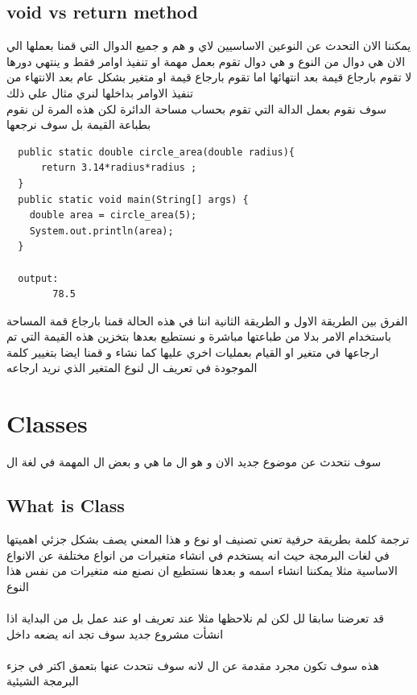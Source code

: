 \subsection{void vs return method}
\begin{AR}
  يمكننا الان التحدث عن 
  النوعين الاساسيين لاي  و هم  و 
  جميع الدوال التي قمنا بعملها الي الان هي دوال من النوع  و هي دوال تقوم بعمل مهمة او تنفيذ اوامر 
  فقط و ينتهي دورها لا تقوم بارجاع قيمة بعد انتهائها اما  تقوم بارجاع قيمة او متغير بشكل عام بعد
  الانتهاء من تنفيذ الاوامر بداخلها لنري مثال علي ذلك\\
  سوف نقوم بعمل الدالة التي تقوم بحساب مساحة الدائرة لكن هذه المرة لن نقوم 
  بطباعة القيمة بل سوف نرجعها 
\end{AR}
\begin{verbatim}
  public static double circle_area(double radius){
      return 3.14*radius*radius ;
  }
  public static void main(String[] args) {
    double area = circle_area(5);
    System.out.println(area);
  }

  output:
        78.5
\end{verbatim}
\begin{AR}
الفرق بين الطريقة الاول و الطريقة الثانية اننا في هذه الحالة قمنا بارجاع قمة المساحة 
باستخدام الامر  بدلا من طباعتها مباشرة و نستطيع بعدها بتخزين هذه القيمة التي تم ارجاعها في متغير 
او القيام بعمليات اخري عليها كما نشاء و قمنا ايضا بتغيير كلمة  الموجودة في تعريف ال  لنوع 
المتغير الذي نريد ارجاعه 
\end{AR}

\section{Classes}
\begin{AR}
سوف نتحدث عن موضوع جديد الان و هو ال  ما هي و بعض ال  المهمة في لغة ال 
\end{AR}
\subsection{What is Class}
\begin{AR}
  ترجمة كلمة  بطريقة حرفية تعني تصنيف او نوع 
  و هذا المعني يصف بشكل جزئي اهميتها في لغات البرمجة حيث انه يستخدم في انشاء متغيرات من انواع 
  مختلفة عن الانواع الاساسية  
  مثلا يمكننا انشاء  اسمه  و بعدها نستطيع ان نصنع منه 
  متغيرات من نفس هذا النوع 
  \\\\
  قد تعرضنا سابقا لل  لكن لم نلاحظها مثلا عند تعريف  او عند عمل  
  بل من البداية اذا انشأت مشروع جديد سوف تجد انه يضعه داخل  
  \\\\
  هذه سوف تكون مجرد مقدمة عن ال  لانه سوف نتحدث عنها بتعمق اكتر في جزء البرمجة الشيئية 
\end{AR}
